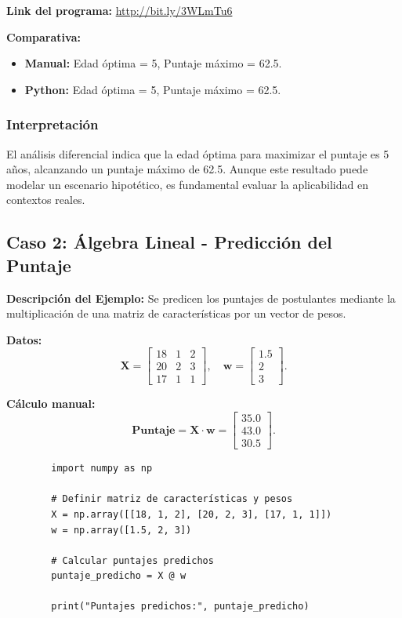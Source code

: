 \documentclass[12pt,a4,oneside]{book}
\begin{document}
	\textbf{Link del programa:} \url{http://bit.ly/3WLmTu6}
	
	\textbf{Comparativa:}
	\begin{itemize}
		\item \textbf{Manual:} Edad óptima = 5, Puntaje máximo = 62.5.
		\item \textbf{Python:} Edad óptima = 5, Puntaje máximo = 62.5.
	\end{itemize}
	
	\subsubsection{Interpretación}
	
	El análisis diferencial indica que la edad óptima para maximizar el puntaje es 5 años, alcanzando un puntaje máximo de 62.5. Aunque este resultado puede modelar un escenario hipotético, es fundamental evaluar la aplicabilidad en contextos reales.
	
	\subsection{Caso 2: Álgebra Lineal - Predicción del Puntaje}
	
	\textbf{Descripción del Ejemplo:}  
	Se predicen los puntajes de postulantes mediante la multiplicación de una matriz de características por un vector de pesos.
	
	\textbf{Datos:}
	\[
	\mathbf{X} = \begin{bmatrix}
		18 & 1 & 2 \\
		20 & 2 & 3 \\
		17 & 1 & 1
	\end{bmatrix}, \quad 
	\mathbf{w} = \begin{bmatrix} 1.5 \\ 2 \\ 3 \end{bmatrix}.
	\]
	
	\textbf{Cálculo manual:}
	\[
	\mathbf{Puntaje} = \mathbf{X} \cdot \mathbf{w} 
	= \begin{bmatrix}
		35.0 \\
		43.0 \\
		30.5
	\end{bmatrix}.
	\]
	
	\begin{verbatim}
		import numpy as np
		
		# Definir matriz de características y pesos
		X = np.array([[18, 1, 2], [20, 2, 3], [17, 1, 1]])
		w = np.array([1.5, 2, 3])
		
		# Calcular puntajes predichos
		puntaje_predicho = X @ w
		
		print("Puntajes predichos:", puntaje_predicho)
	\end{verbatim}
	
\end{document}
